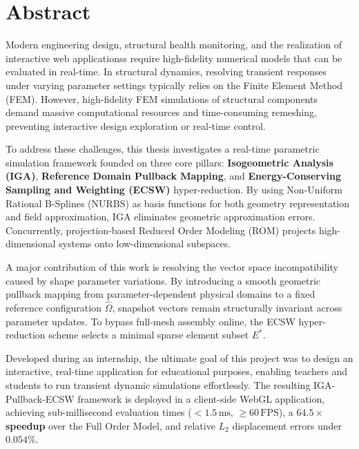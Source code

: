 \chapter*{Abstract}

Modern engineering design, structural health monitoring, and the realization of interactive web applicationss require high-fidelity numerical models that can be evaluated in real-time. In structural dynamics, resolving transient responses under varying parameter settings typically relies on the Finite Element Method (FEM). However, high-fidelity FEM simulations of structural components demand massive computational resources and time-consuming remeshing, preventing interactive design exploration or real-time control.

To address these challenges, this thesis investigates a real-time parametric simulation framework founded on three core pillars: \textbf{Isogeometric Analysis (IGA)}, \textbf{Reference Domain Pullback Mapping}, and \textbf{Energy-Conserving Sampling and Weighting (ECSW)} hyper-reduction. By using Non-Uniform Rational B-Splines (NURBS) as basis functions for both geometry representation and field approximation, IGA eliminates geometric approximation errors. Concurrently, projection-based Reduced Order Modeling (ROM) projects high-dimensional systems onto low-dimensional subspaces.

A major contribution of this work is resolving the vector space incompatibility caused by shape parameter variations. By introducing a smooth geometric pullback mapping from parameter-dependent physical domains to a fixed reference configuration $\hat{\Omega}$, snapshot vectors remain structurally invariant across parameter updates. To bypass full-mesh assembly online, the ECSW hyper-reduction scheme selects a minimal sparse element subset $E^*$.

Developed during an internship, the ultimate goal of this project was to design an interactive, real-time application for educational purposes, enabling teachers and students to run transient dynamic simulations effortlessly. The resulting IGA-Pullback-ECSW framework is deployed in a client-side WebGL application, achieving sub-millisecond evaluation times ($<1.5\,\text{ms}$, $\ge 60\,\text{FPS}$), a \textbf{$\mathbf{64.5\times}$ speedup} over the Full Order Model, and relative $L_2$ displacement errors under $0.054\%$.

